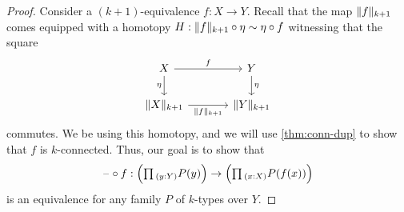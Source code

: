 \begin{proof}
  Consider a $(k+1)$-equivalence $f:X\to Y$. Recall that the map $\trunc{k+1}{f}$ comes equipped with a homotopy $H:\trunc{k+1}{f}\circ\eta\htpy\eta\circ f$ witnessing that the square
  \begin{equation*}
    \begin{tikzcd}[column sep=large]
      X \arrow[r,"f"] \arrow[d,swap,"\eta"] & Y \arrow[d,"\eta"] \\
      \trunc{k+1}{X} \arrow[r,swap,"\trunc{k+1}{f}"] & \trunc{k+1}{Y}
    \end{tikzcd}
  \end{equation*}
  commutes. We be using this homotopy, and we will use \cref{thm:conn-dup} to show that $f$ is $k$-connected. Thus, our goal is to show that
  \begin{equation*}
    \blank\circ f:\Big(\prd{y:Y}P(y)\Big)\to\Big(\prd{x:X}P(f(x))\Big)
  \end{equation*}
  is an equivalence for any family $P$ of $k$-types over $Y$.


\end{proof}
